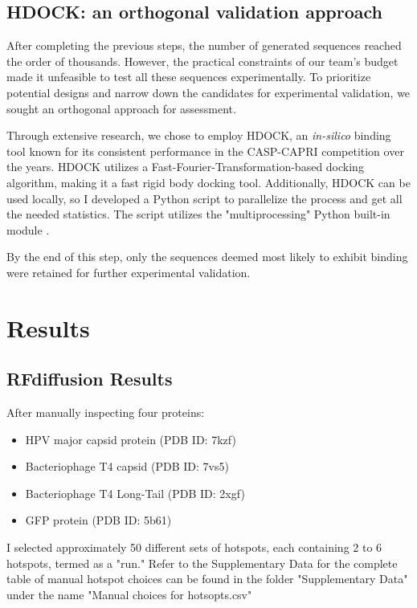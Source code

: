 \documentclass[11pt,a4paper]{article}
\begin{document}
\subsection{HDOCK: an orthogonal validation approach}

After completing the previous steps, the number of generated sequences reached the order of thousands. However, the practical constraints of our team's budget made it unfeasible to test all these sequences experimentally. To prioritize potential designs and narrow down the candidates for experimental validation, we sought an orthogonal approach for assessment.

Through extensive research, we chose to employ HDOCK, an \emph{in-silico} binding tool \cite{yan2017hdock} known for its consistent performance in the CASP-CAPRI \cite{casp-capri} competition over the years. HDOCK utilizes a Fast-Fourier-Transformation-based docking algorithm, making it a fast rigid body docking tool. Additionally, HDOCK can be used locally, so I developed a Python script to parallelize the process and get all the needed statistics. The script utilizes the "multiprocessing" Python built-in module \cite{python_multiprocessing}.

By the end of this step, only the sequences deemed most likely to exhibit binding were retained for further experimental validation.


\section{Results}

\subsection{RFdiffusion Results}

After manually inspecting four proteins:

\begin{itemize}
    \item HPV major capsid protein (PDB ID: 7kzf)
    \item Bacteriophage T4 capsid (PDB ID: 7vs5)
    \item Bacteriophage T4 Long-Tail (PDB ID: 2xgf)
    \item GFP protein (PDB ID: 5b61)
\end{itemize}

I selected approximately 50 different sets of hotspots, each containing 2 to 6 hotspots, termed as a "run." Refer to the Supplementary Data for the complete table of manual hotspot choices can be found in the folder "Supplementary Data" under the name "Manual choices for hotsopts.csv"
\end{document}
